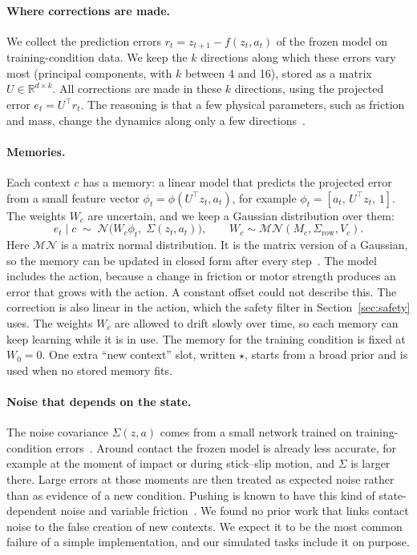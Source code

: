 \documentclass[10pt]{article}
\newcommand{\N}{\mathcal{N}}
\newcommand{\novel}{\star}
\begin{document}
\paragraph{Where corrections are made.}
We collect the prediction errors $r_t=z_{t+1}-f(z_t,a_t)$ of the frozen model on training-condition
data. We keep the $k$ directions along which these errors vary most (principal components, with
$k$ between 4 and 16), stored as a matrix $U\in\mathbb{R}^{d\times k}$. All corrections are made in
these $k$ directions, using the projected error $e_t=U^\top r_t$. The reasoning is that a few physical
parameters, such as friction and mass, change the dynamics along only a few
directions~\cite{doshivelez2016hipmdp,killian2017robust}.

\paragraph{Memories.}
Each context $c$ has a memory: a linear model that predicts the projected error from a small feature
vector $\phi_t=\phi(U^\top z_t,a_t)$, for example $\phi_t=[a_t,\,U^\top z_t,\,1]$. The weights $W_c$ are
uncertain, and we keep a Gaussian distribution over them:
\begin{equation}
  e_t\mid c\;\sim\;\N\big(W_c\phi_t,\;\Sigma(z_t,a_t)\big),\qquad
  W_c\sim\mathcal{MN}(M_c,\Sigma_{\text{row}},V_c).
  \label{eq:adapter}
\end{equation}
Here $\mathcal{MN}$ is a matrix normal distribution. It is the matrix version of a Gaussian, so the
memory can be updated in closed form after every step~\cite{harrison2018alpaca}. The model includes
the action, because a change in friction or motor strength produces an error that grows with the
action. A constant offset could not describe this. The correction is also linear in the action, which
the safety filter in Section~\ref{sec:safety} uses. The weights $W_c$ are allowed to drift slowly over
time, so each memory can keep learning while it is in use. The memory for the training condition is
fixed at $W_0=0$. One extra ``new context'' slot, written $\novel$, starts from a broad prior and is
used when no stored memory fits.

\paragraph{Noise that depends on the state.}
The noise covariance $\Sigma(z,a)$ comes from a small network trained on training-condition
errors~\cite{kersting2007hetgp}. Around contact the frozen model is already less accurate, for
example at the moment of impact or during stick--slip motion, and $\Sigma$ is larger there. Large
errors at those moments are then treated as expected noise rather than as evidence of a new condition.
Pushing is known to have this kind of state-dependent noise and variable
friction~\cite{bauza2017probpush,ma2018friction}. We found no prior work that links contact noise to
the false creation of new contexts. We expect it to be the most common failure of a simple
implementation, and our simulated tasks include it on purpose.
\end{document}
